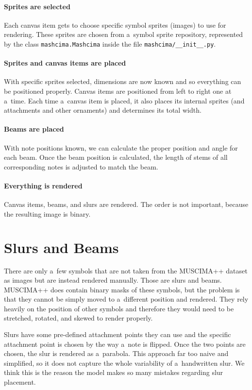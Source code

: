 \paragraph{Sprites are selected} Each canvas item gets to choose specific symbol sprites (images) to use for rendering. These sprites are chosen from a~symbol sprite repository, represented by the class \verb`mashcima`\allowbreak\verb`.Mashcima` inside the file \verb`mashcima/`\allowbreak\verb`__init__.py`.

\paragraph{Sprites and canvas items are placed} With specific sprites selected, dimensions are now known and so everything can be positioned properly. Canvas items are positioned from left to right one at a~time. Each time a~canvas item is placed, it also places its internal sprites (and attachments and other ornaments) and determines its total width.

\paragraph{Beams are placed} With note positions known, we can calculate the proper position and angle for each beam. Once the beam position is calculated, the length of stems of all corresponding notes is adjusted to match the beam.

\paragraph{Everything is rendered} Canvas items, beams, and slurs are rendered. The order is not important, because the resulting image is binary.


\section{Slurs and Beams}

There are only a~few symbols that are not taken from the MUSCIMA++ dataset as images but are instead rendered manually. Those are slurs and beams. MUSCIMA++ does contain binary masks of these symbols, but the problem is that they cannot be simply moved to a~different position and rendered. They rely heavily on the position of other symbols and therefore they would need to be stretched, rotated, and skewed to render properly.

Slurs have some pre-defined attachment points they can use and the specific attachment point is chosen by the way a~note is flipped. Once the two points are chosen, the slur is rendered as a~parabola. This approach far too naive and simplified, so it does not capture the whole variability of a~handwritten slur. We think this is the reason the model makes so many mistakes regarding slur placement.

